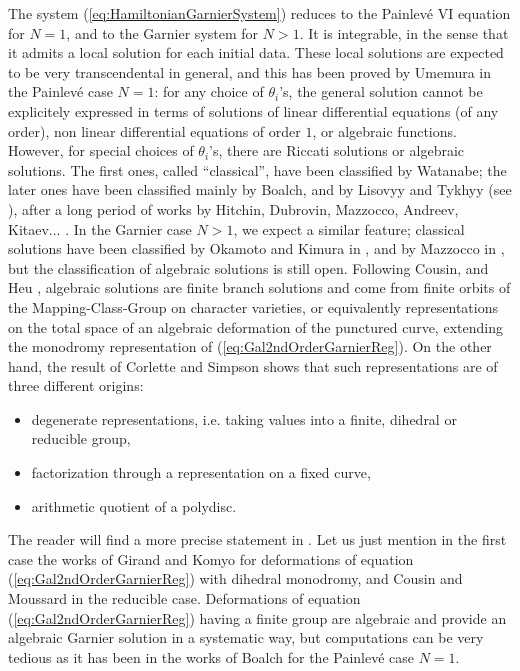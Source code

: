 \documentclass[12]{amsart}
\begin{document}
The system (\ref{eq:HamiltonianGarnierSystem}) reduces to the Painlev\'e VI equation for $N=1$, and to the Garnier system
for $N>1$. It is integrable, in the sense that it admits a local solution for each initial data. These local solutions are
expected to be very transcendental in general, and this has been proved by Umemura in the Painlev\'e case $N=1$:
for any choice of $\theta_i$'s, the general solution cannot be explicitely expressed in terms of solutions of linear
differential equations (of any order), non linear differential equations of order $1$, or algebraic functions.
However, for special choices of $\theta_i$'s, there are Riccati solutions or algebraic solutions.
The first ones, called ``classical'', have been classified by Watanabe; the later ones have been
classified mainly by Boalch, and by Lisovyy and Tykhyy (see \cite{Boalch,LisovyyTykhyy}),
after a long period of works by Hitchin, Dubrovin, Mazzocco, Andreev, Kitaev... 
\cite{Hitchin,DM0,MazzoccoPicard,Doran,AK,AK2,Kitaev,Kitaev2,Kitaev3,Kitaev4,BoalchIco,BoalchTetraOcta,Boalch6,BoalchHigherGenus,VK,VK2}. In the Garnier case $N>1$, we expect a similar feature; classical solutions have been classified by 
Okamoto and Kimura in \cite{OK}, and by 
Mazzocco in \cite{MazzoccoGarnier}, but the classification of algebraic solutions is still open. 
Following Cousin, and Heu \cite{Cousin,CousinHeu}, algebraic solutions are finite branch solutions and come from finite orbits
of the Mapping-Class-Group on character varieties, or equivalently representations on the total space of an algebraic deformation of the punctured curve, extending the monodromy representation of (\ref{eq:Gal2ndOrderGarnierReg}).
On the other hand, the result of Corlette and Simpson \cite{CS}
shows that such representations are of three different origins:
\begin{itemize}
\item degenerate representations, i.e. taking values into a finite, dihedral or reducible group,
\item factorization through a representation on a fixed curve,
\item arithmetic quotient of a polydisc.
\end{itemize}
The reader will find a more precise statement in \cite{CS}. Let us just mention in the first case
the works of Girand \cite{Girand} and Komyo \cite{Komyo} for deformations of equation (\ref{eq:Gal2ndOrderGarnierReg})
with dihedral monodromy, and Cousin and Moussard \cite{CousinMoussard} in the reducible case.
Deformations of equation (\ref{eq:Gal2ndOrderGarnierReg}) having a finite group are algebraic 
and provide an algebraic Garnier solution in a systematic way, but computations can be very tedious
as it has been in the works of Boalch for the Painlev\'e case $N=1$.
\end{document}
